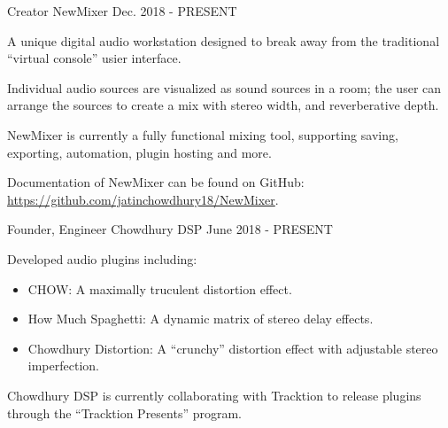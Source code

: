 

\begin{cventries}

  \cventry
    {Creator} %
    {NewMixer} %
    {} %
    {Dec. 2018 - PRESENT} %
    {
      \begin{cvitems} %
        \item {A unique digital audio workstation designed to break away from the traditional ``virtual console'' usier interface.}
        \item {Individual audio sources are visualized as sound sources in a room; the user can arrange the sources to create a mix with stereo width, and reverberative depth.}
        \item {NewMixer is currently a fully functional mixing tool, supporting saving, exporting, automation, plugin hosting and more.}
        \item {Documentation of NewMixer can be found on GitHub: \url{https://github.com/jatinchowdhury18/NewMixer}.}
      \end{cvitems}
    }

    \cventry
    {Founder, Engineer} %
    {Chowdhury DSP} %
    {} %
    {June 2018 - PRESENT} %
    {
      \begin{cvitems} %
        \item {Developed audio plugins including:}
        \begin{itemize}
            \item {CHOW: A maximally truculent distortion effect.}
            \item {How Much Spaghetti: A dynamic matrix of stereo delay effects.}
            \item {Chowdhury Distortion: A ``crunchy'' distortion effect with adjustable stereo imperfection.}
        \end{itemize}
        \item {Chowdhury DSP is currently collaborating with Tracktion to release plugins through the ``Tracktion Presents'' program.}
      \end{cvitems}
    }


\end{cventries}
